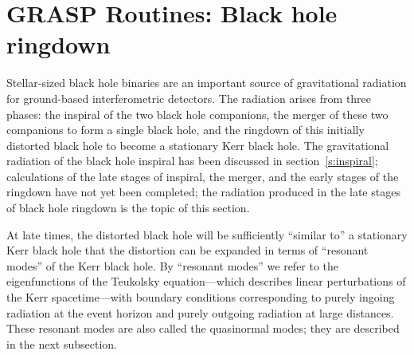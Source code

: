 \section{GRASP Routines: Black hole ringdown}

Stellar-sized black hole binaries are an important source of gravitational
radiation for ground-based interferometric detectors.  The radiation arises
from three phases: the inspiral of the two black hole companions, the merger
of these two companions to form a single black hole, and the ringdown of this
initially distorted black hole to become a stationary Kerr black hole.
The gravitational radiation of the black hole inspiral has been discussed
in section~\ref{s:inspiral}; calculations of the late stages of inspiral, the
merger, and the early stages of the ringdown have not yet been completed;
the radiation produced in the late stages of black hole ringdown is the topic
of this section.

At late times, the distorted black hole will be sufficiently ``similar to''
a stationary Kerr black hole that the distortion can be expanded in terms
of ``resonant modes'' of the Kerr black hole.  By ``resonant modes'' we refer
to the eigenfunctions of the Teukolsky equation---which describes linear
perturbations of the Kerr spacetime---with boundary conditions corresponding to
purely ingoing radiation at the event horizon and purely outgoing radiation
at large distances.  These resonant modes are also called the quasinormal
modes; they are described in the next subsection.


\clearpage
